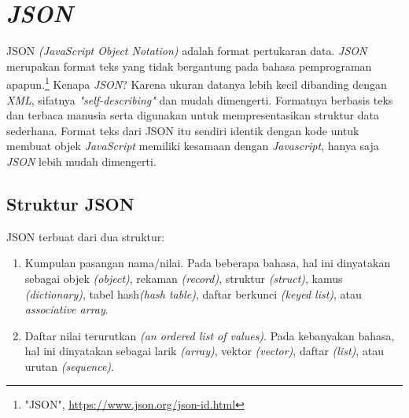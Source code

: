 \section{\textit{JSON}}
\label{sec: JSON}

JSON \textit{(JavaScript Object Notation)} adalah format pertukaran data. \textit{JSON} merupakan format teks yang tidak bergantung pada bahasa pemprograman apapun.\footnote{"JSON", \url{https://www.json.org/json-id.html}} Kenapa \textit{JSON}? Karena ukuran datanya lebih kecil dibanding dengan \textit{XML}, sifatnya \textit{"self-describing"} dan mudah dimengerti. Formatnya berbasis teks dan terbaca manusia serta digunakan untuk mempresentasikan struktur data sederhana. Format teks dari JSON itu sendiri identik dengan kode untuk membuat objek \textit{JavaScript} memiliki kesamaan dengan \textit{Javascript}, hanya saja \textit{JSON} lebih mudah dimengerti. 

\subsection{Struktur JSON}
\label{sec: Struktur JSON}
JSON terbuat dari dua struktur:
\begin{enumerate}
\item Kumpulan pasangan nama/nilai. Pada beberapa bahasa, hal ini dinyatakan sebagai objek \textit{(object)}, rekaman \textit{(record)}, struktur \textit{(struct)}, kamus \textit{(dictionary)}, tabel hash\textit{(hash table)}, daftar berkunci \textit{(keyed list)}, atau \textit{associative array}.
\item Daftar nilai terurutkan \textit{(an ordered list of values)}. Pada kebanyakan bahasa, hal ini dinyatakan sebagai larik \textit{(array)}, vektor \textit{(vector)}, daftar \textit{(list)}, atau urutan \textit{(sequence)}. 
\end{enumerate}

